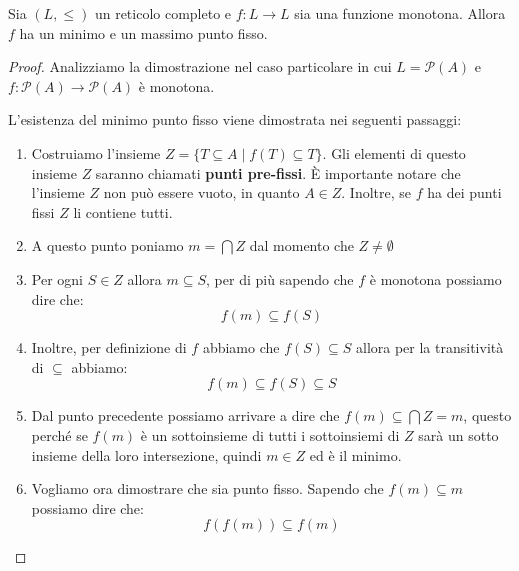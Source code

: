 \begin{teorema}
    Sia $(L,\leq)$ un reticolo completo e $f: L \to L$ sia una funzione monotona.
    Allora $f$ ha un minimo e un massimo punto fisso.
    \begin{proof}
        Analizziamo la dimostrazione nel caso particolare in cui $L = \mathcal{P}(A)$
        e $f: \mathcal{P}(A) \to \mathcal{P}(A)$ è monotona. 
        
        L'esistenza del minimo punto fisso viene dimostrata nei seguenti passaggi:
        \begin{enumerate}
            \item Costruiamo l'insieme $Z = \{T \subseteq A \mid f(T) \subseteq
                      T\}$. Gli elementi di questo insieme $Z$ saranno chiamati
                  \textbf{punti pre-fissi}. È importante notare che l'insieme $Z$
                  non può essere vuoto, in quanto $A \in Z$. Inoltre, se $f$ ha
                  dei punti fissi $Z$ li contiene tutti.
            \item A questo punto poniamo $m = \bigcap Z$ dal momento che $Z \neq
                      \emptyset$
            \item Per ogni $S \in Z$ allora $m \subseteq S$, per di più sapendo
                  che $f$ è monotona possiamo dire che:
                  \begin{equation}
                      f(m) \subseteq f(S)
                  \end{equation}
            \item Inoltre, per definizione di $f$ abbiamo che $f(S) \subseteq S$
                  allora per la transitività di $\subseteq$ abbiamo:
                  \begin{equation}
                      f(m) \subseteq f(S) \subseteq S
                  \end{equation}
            \item Dal punto precedente possiamo arrivare a dire che $f(m) \subseteq
                      \bigcap Z = m$, questo perché se $f(m)$ è un sottoinsieme di
                  tutti i sottoinsiemi di $Z$ sarà un sotto insieme della loro
                  intersezione, quindi $m \in Z$ ed è il minimo.
            \item Vogliamo ora dimostrare che sia punto fisso. Sapendo che
                  $f(m) \subseteq m$ possiamo dire che:
                  \begin{equation}
                      f(f(m)) \subseteq f(m)
                  \end{equation}

\end{enumerate}
\end{proof}
\end{teorema}
